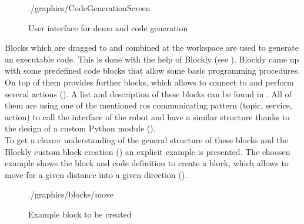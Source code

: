 \begin{figure}[htbp]
	\centering
	\begin{overpic}[width=\linewidth]{./graphics/CodeGenerationScreen}
	\end{overpic}
	\caption{User interface for demo and code generation}%
	\label{fig:CodeGeneration}%
\end{figure}

Blocks which are dragged to and combined at the workspace are used to generate an executable code. This is done with the help of Blockly (see ). Blockly came up with some predefined code blocks that allow some basic programming procedures.
On top of them \toolname{} provides further blocks, which allows to connect to \hobbit{} and perform several actions (). A list and description of these blocks can be found in . All of them are using one of the mentioned \gls{ros} communicating pattern (topic, service, action) to call the interface of the robot and have a similar structure thanks to the design of a custom Python module (). \\

To get a clearer understanding of the general structure of these blocks and the Blockly custom block creation () an explicit example is presented. The choosen example shows the block and code definition to create a block, which allows to move \hobbit{} for a given distance into a given direction ().

\begin{figure}[htbp]
	\centering
	\begin{overpic}[width=0.3\linewidth]{./graphics/blocks/move}
	\end{overpic}
	\caption{Example block to be created}%
	\label{fig:ExBlockMove}%
\end{figure}

\begin{figure}[htbp]
	
\end{figure}

